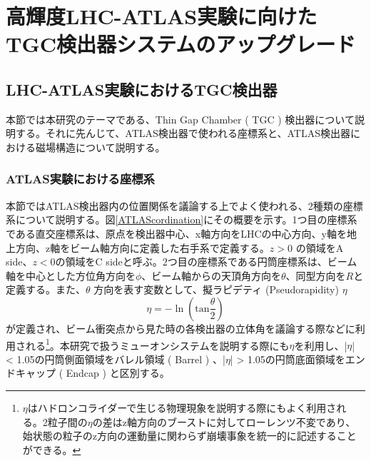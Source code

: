 \chapter{高輝度LHC-ATLAS実験に向けたTGC検出器システムのアップグレード}
\label{chap_TGC}




\section{LHC-ATLAS実験におけるTGC検出器}
本節では本研究のテーマである、Thin Gap Chamber ( TGC ) 検出器について説明する。それに先んじて、ATLAS検出器で使われる座標系と、ATLAS検出器における磁場構造について説明する。

\subsection{ATLAS実験における座標系}
本節ではATLAS検出器内の位置関係を議論する上でよく使われる、2種類の座標系について説明する。図\ref{ATLAScordination}にその概要を示す。1つ目の座標系である直交座標系は、原点を検出器中心、x軸方向をLHCの中心方向、y軸を地上方向、z軸をビーム軸方向に定義した右手系で定義する。$z>0$ の領域をA side、$z<0$の領域をC sideと呼ぶ。2つ目の座標系である円筒座標系は、ビーム軸を中心とした方位角方向を$\phi$、ビーム軸からの天頂角方向を$\theta$、同型方向を$R$と定義する。また、$\theta$ 方向を表す変数として、擬ラピデティ  (Pseudorapidity) $\eta$
\begin{equation}
    \eta = -\ln(\mathrm{tan}\frac{\theta}{2})
\end{equation}
が定義され、ビーム衝突点から見た時の各検出器の立体角を議論する際などに利用される\footnote{$\eta$はハドロンコライダーで生じる物理現象を説明する際にもよく利用される。2粒子間の$\eta$の差はz軸方向のブーストに対してローレンツ不変であり、始状態の粒子のz方向の運動量に関わらず崩壊事象を統一的に記述することができる。}。本研究で扱うミューオンシステムを説明する際にも$\eta$を利用し、|$\eta$| < 1.05の円筒側面領域をバレル領域 ( Barrel ) 、|$\eta$| > 1.05の円筒底面領域をエンドキャップ ( Endcap ) と区別する。

